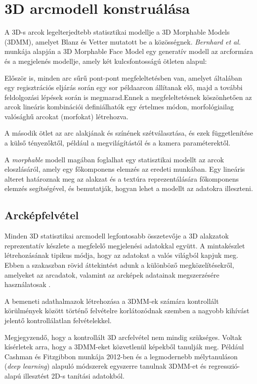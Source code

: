 \documentclass[12pt,a4]{article}
\begin{document}
 
	 \section{3D arcmodell konstruálása}
	 \label{3d}
	 \cite{survey} A 3D-s arcok legelterjedtebb statisztikai modellje a 3D Morphable Models (3DMM), amelyet Blanz és Vetter \cite{blanzvetter} mutatott be a közösségnek. \textit{Bernhard et al.} \cite{3dmm} munkája alapján a 3D Morphable Face Model egy generatív modell az arcformára
	 és a megjelenés modellje, amely két kulcsfontosságú ötleten alapul:
	 
	  Először is, minden arc
	 sűrű pont-pont megfeleltetésben van, amelyet általában egy regisztrációs eljárás során egy sor példaarcon állítanak elő, majd
	 a további feldolgozási lépések során is megmarad.Ennek a megfeleltetésnek köszönhetően az arcok lineáris kombinációi definiálhatók egy értelmes módon, morfológiailag valósághű arcokat (morfokat) létrehozva.
	 
	 
	 A második ötlet az arc alakjának és színének szétválasztása, és ezek függetlenítése a külső tényezőktől, például a megvilágítástól és a kamera paraméterektől.
	 
	  A \textit{morphable} modell magában foglalhat egy statisztikai modellt
	 az arcok eloszlásáról, amely egy főkomponens elemzés az eredeti munkában.
  Egy lineáris
alteret határoznak meg az alakzat és a textúra reprezentálására főkomponens elemzés \cite{PCA} segítségével, és bemutatják, hogyan lehet a modellt az adatokra illeszteni. 

	 \subsection{Arcképfelvétel}
	  Minden 3D statisztikai arcmodell legfontosabb összetevője a 3D alakzatok reprezentatív készlete a megfelelő megjelenési adatokkal együtt. A mintakészlet létrehozásának tipikus módja, hogy az adatokat a valós világból kapjuk meg. Ebben a szakaszban rövid áttekintést adunk a különböző megközelítésekről, amelyeket az arcadatok, valamint az arcképek adatainak megszerzésére használatosak \cite{3dmm}.
	  
	 A bemeneti adathalmazok létrehozása a 3DMM-ek számára kontrollált körülmények között történő felvételre korlátozódnak szemben a nagyobb kihívást jelentő kontrollálatlan felvételekkel.
	 
	 Megjegyzendő, hogy a kontrollált 3D arcfelvétel nem mindig szükséges. Voltak kísérletek arra, hogy a 3DMM-eket közvetlenül képekből tanulják meg. Például Cashman és Fitzgibbon munkája 2012-ben \cite{dolphins} és a legmodernebb mélytanuláson (\textit{deep learning}) alapuló módszerek egyszerre tanulnak 3DMM-et és regresszió-alapú illesztést 2D-s tanítási adatokból.
	 
\end{document}
